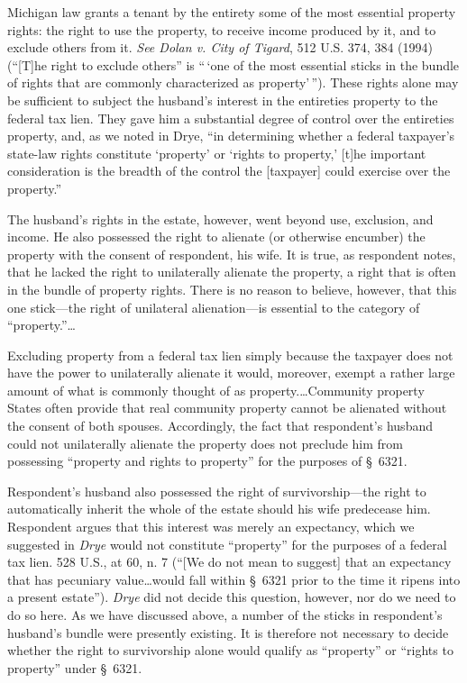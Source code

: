 Michigan law grants a tenant by the entirety some of the most essential property
rights: the right to use the property, to receive income produced by it, and to
exclude others from it. \emph{See Dolan v. City of Tigard}, 512 U.S. 374, 384
(1994) (``[T]he right to exclude others'' is ``\,`one of the most essential
sticks in the bundle of rights that are commonly characterized as
property'\,''). These rights alone may be sufficient to subject the husband's
interest in the entireties property to the federal tax lien. They gave him a
substantial degree of control over the entireties property, and, as we noted in
Drye, ``in determining whether a federal taxpayer's state-law rights constitute
`property' or `rights to property,' [t]he important consideration is the breadth
of the control the [taxpayer] could exercise over the property.''

The husband's rights in the estate, however, went beyond use, exclusion, and
income. He also possessed the right to alienate (or otherwise encumber) the
property with the consent of respondent, his wife. It is true, as respondent
notes, that he lacked the right to unilaterally alienate the property, a right
that is often in the bundle of property rights. There is no reason to believe,
however, that this one stick---the right of unilateral alienation---is
essential to the category of ``property.''\dots

Excluding property from a federal tax lien simply because the taxpayer does not
have the power to unilaterally alienate it would, moreover, exempt a rather
large amount of what is commonly thought of as property.\dots Community
property States often provide that real community property cannot be alienated
without the consent of both spouses. Accordingly, the fact that respondent's
husband could not unilaterally alienate the property does not preclude him from
possessing ``property and rights to property'' for the purposes of \S~6321.

Respondent's husband also possessed the right of survivorship---the right to
automatically inherit the whole of the estate should his wife predecease him.
Respondent argues that this interest was merely an expectancy, which we
suggested in \emph{Drye} would not constitute ``property'' for the purposes of a
federal tax lien. 528 U.S., at 60, n. 7 (``[We do not mean to suggest] that an
expectancy that has pecuniary value\dots would fall within \S~6321 prior
to the time it ripens into a present estate''). \emph{Drye} did not decide this
question, however, nor do we need to do so here. As we have discussed above, a
number of the sticks in respondent's husband's bundle were presently existing.
It is therefore not necessary to decide whether the right to survivorship alone
would qualify as ``property'' or ``rights to property'' under \S~6321.


